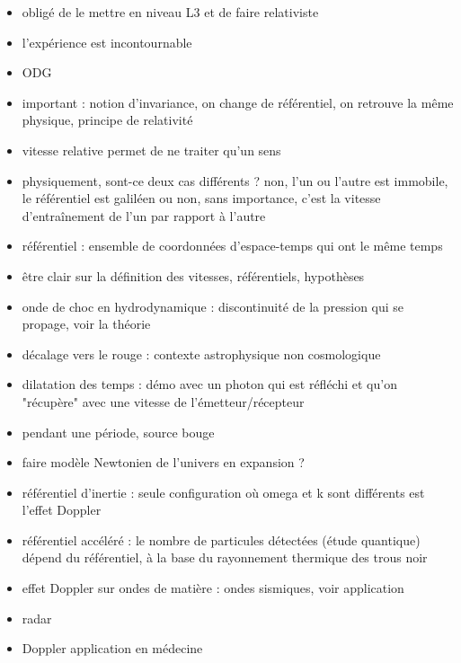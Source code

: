 \begin{remarques} \begin{itemize} 
\item obligé de le mettre en niveau L3 et de faire relativiste
\item l'expérience est incontournable
\item ODG
\item important : notion d'invariance, on change de référentiel, on retrouve la même physique, principe de relativité
\item vitesse relative permet de ne traiter qu'un sens
\item physiquement, sont-ce deux cas différents ? non, l'un ou l'autre est immobile, le référentiel est galiléen ou non, sans importance, c'est la vitesse d'entraînement de l'un par rapport à l'autre
\item référentiel : ensemble de coordonnées d'espace-temps qui ont le même temps
\item être clair sur la définition des vitesses, référentiels, hypothèses
\item onde de choc en hydrodynamique : discontinuité de la pression qui se propage, voir la théorie
\item décalage vers le rouge : contexte astrophysique non cosmologique
\item dilatation des temps : démo avec un photon qui est réfléchi et qu'on "récupère" avec une vitesse de l'émetteur/récepteur
\item pendant une période, source bouge
\item faire modèle Newtonien de l'univers en expansion ?
\item référentiel d'inertie : seule configuration où omega et k sont différents est l'effet Doppler 
\item référentiel accéléré : le nombre de particules détectées (étude quantique) dépend du référentiel, à la base du rayonnement thermique des trous noir
\item effet Doppler sur ondes de matière : ondes sismiques, voir application
\item radar
\item Doppler application en médecine
\end{itemize} \end{remarques}